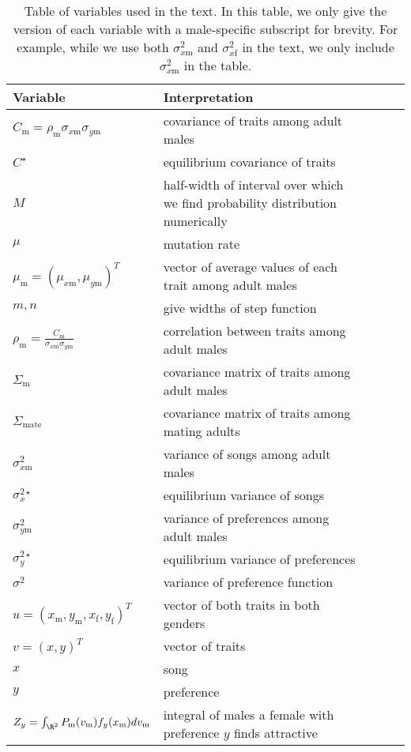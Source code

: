 \documentclass{article}
\newcommand{\x}[1]{\text{#1}}
\begin{document}
\begin{table}
\caption{\label{variables} Table of variables used in the text. In this table, we only give the version of each variable with a male-specific subscript for brevity. For example, while we use both $\sigma_{x\x{m}}^2$ and $\sigma_{x\x{f}}^2$ in the text, we only include $\sigma_{x\x{m}}^2$ in the table.}
\begin{tabular}{lllll}
Variable & Interpretation
\\\hline $C_\x{m}=\rho_\x{m}\sigma_{x\x{m}}\sigma_{y\x{m}}$ & covariance of traits among adult males
\\ $C^\star$ & equilibrium covariance of traits
\\ $M$ & half-width of interval over which we find probability distribution numerically
\\ $\mu$ & mutation rate 
\\$\mu_\x{m}=(\mu_{x\x{m}},\mu_{y\x{m}})^T$ & vector of average values of each trait among adult males 
\\$m,n$ & give widths of step function
\\ $\rho_\x{m}=\frac{C_\x{m}}{\sigma_{x\x{m}}\sigma_{y\x{m}}}$ & correlation between traits among adult males
\\$\Sigma_\x{m}$ & covariance matrix of traits among adult males
\\$\Sigma_\text{mate}$ & covariance matrix of traits among mating adults
\\$\sigma_{x\x{m}}^2$ & variance of songs among adult males
\\$\sigma_{x}^{2\star}$ & equilibrium variance of songs
\\$\sigma_{y\x{m}}^2$ & variance of preferences among adult males
\\$\sigma_y^{2\star}$ & equilibrium variance of preferences
\\$\sigma^2$ & variance of preference function
\\$u=(x_\x{m},y_\x{m},x_\x{f},y_\x{f})^T$ & vector of both traits in both genders
\\$v=(x,y)^T$ & vector of traits
\\$x$ & song
\\$y$ & preference
\\$Z_y=\int_{\R^2}P_\x{m}(v_\x{m})f_{y}(x_\x{m})dv_\x{m}$ & integral of males a female with preference $y$ finds attractive
\end{tabular}
\end{table}
\end{document}
